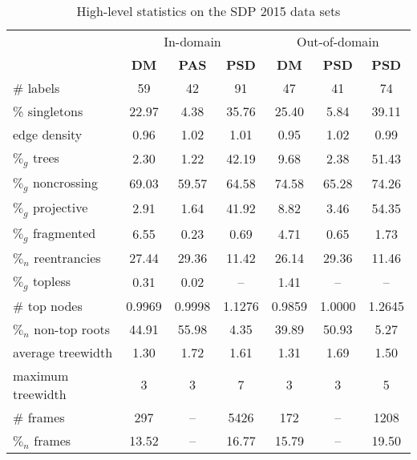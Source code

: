 \begin{table}
    \centering
    \smaller[0.5]
    \begin{tabular}{@{}lcccccc@{}}
        \toprule
        & \multicolumn{3}{c}{In-domain}
        & \multicolumn{3}{c}{Out-of-domain} \\
        \cmidrule(lr){2-4}
        \cmidrule(lr){5-7}
        \textbf{} & \textbf{DM} & \textbf{PAS} & \textbf{PSD} &
        \textbf{DM} & \textbf{PSD} & \textbf{PSD} \\
        \midrule
        \# labels & 59 & 42 & 91 & 47 & 41 & 74 \\
        \% singletons & 22.97 & 4.38 & 35.76 & 25.40 & 5.84 & 39.11 \\
        edge density & 0.96 & 1.02 & 1.01 &  0.95 & 1.02 & 0.99 \\
        $\%_g$ trees & 2.30 & 1.22 & 42.19 & 9.68 & 2.38 & 51.43 \\
        $\%_g$ noncrossing & 69.03 & 59.57 & 64.58 & 74.58 & 65.28 & 74.26 \\
        $\%_g$ projective & 2.91 & 1.64 & 41.92 & 8.82 & 3.46 & 54.35 \\
        $\%_g$ fragmented & 6.55 & 0.23 & 0.69 & 4.71 & 0.65 & 1.73 \\
        $\%_n$ reentrancies & 27.44 & 29.36 & 11.42 & 26.14 & 29.36 & 11.46 \\
        $\%_g$ topless & 0.31 & 0.02 & – & 1.41 & – & – \\
        \# top nodes & 0.9969 & 0.9998 & 1.1276 & 0.9859 & 1.0000 & 1.2645 \\
        $\%_n$ non-top roots & 44.91 & 55.98 & 4.35 & 39.89 & 50.93 & 5.27 \\
        average treewidth & 1.30 & 1.72 & 1.61 & 1.31 & 1.69 & 1.50  \\
        maximum treewidth & 3 & 3 & 7  & 3 & 3 & 5 \\
        \midrule
        \# frames & 297 & – & 5426  & 172 & – & 1208 \\
        $\%_n$ frames & 13.52 & – & 16.77 & 15.79 & – & 19.50 \\
        \bottomrule
    \end{tabular}
    \caption{High-level statistics on the SDP 2015 data sets}
    \label{fig:data}
\end{table}


